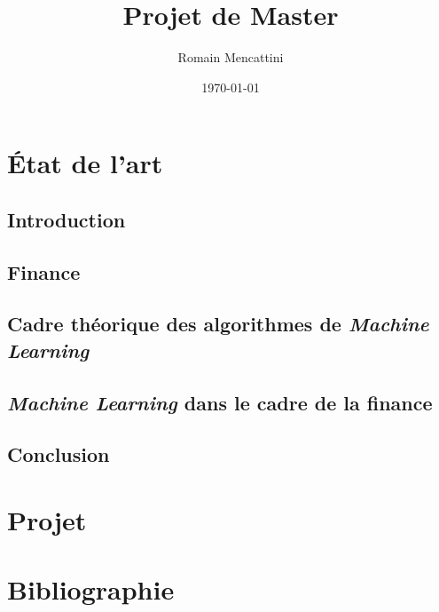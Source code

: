\documentclass[a4paper, 11pt]{article}
\title{Projet de Master}
\author{Romain Mencattini}
\date{\today}
\begin{document}
\maketitle
\newpage
\tableofcontents
\newpage

\section{État de l'art}
\subsection{Introduction}
\subsection{Finance}
\subsection{Cadre théorique des algorithmes de \textit{Machine Learning}}
\subsection{\textit{Machine Learning} dans le cadre de la finance}
\subsection{Conclusion}
\newpage
\section{Projet}
\newpage
\section{Bibliographie}
\end{document}

